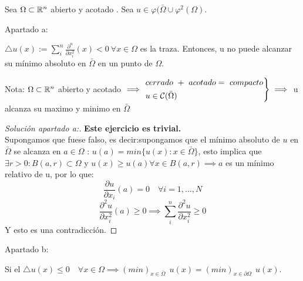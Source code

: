 \begin{ejer}
	Sea $\Omega \subset \mathbb{R}^n$ abierto y acotado . Sea $u \in \varphi(\bar{\Omega} \cup \varphi^2(\Omega)$.

	Apartado a:

	$\triangle u(x):= \sum_i^n \frac{\partial^u}{\partial x_i^2}(x) < 0 \ \forall x \in \Omega$ es la traza. Entonces, u no puede alcanzar su mínimo absoluto en $\bar{\Omega}$ en un punto de $\Omega$.

Nota:
	$\Omega \subset \mathbb{R}^n$ abierto y acotado $\implies \begin{rcases}
	cerrado \ + \ acotado = \ compacto \\
	u \in \mathcal{C}(\bar{\Omega})
\end{rcases}\implies $ u alcanza su maximo y minimo en $\bar{\Omega}$


\begin{proof}[Solución apartado a:] \textbf{Este ejercicio es trivial.}\\
	Supongamos que fuese falso, es decir:supongamos que el mínimo absoluto de $u$ en $\bar{\Omega}$ se alcanza en $a\in \Omega$ : $u(a) = min\{u(x): x \in \bar{\Omega}\}$, esto implica que $\exists r > 0 : B(a,r) \subset \Omega $ y $u(x) \geq u(a) \forall x \in B(a,r) \implies a$ es un mínimo relativo de u, por lo que:
	\[
	\frac{\partial u}{\partial x_i}(a) = 0 \quad \forall i = 1,...,N
	\]
	\[
	\frac{\partial^2 u}{\partial x_i^2}(a) \geq 0 \implies \sum_i^n \frac{\partial^2u}{\partial x_i^2} \geq 0
	\]
	Y esto es una contradicción.
\end{proof}

Apartado b:

Si el $\triangle u(x) \leq 0 \quad \forall x \in \Omega \implies (min)_{x\in \bar{\Omega}} \ \ u(x) = (min)_{x \in \partial \Omega}  \ \ u(x)$.


\end{ejer}

